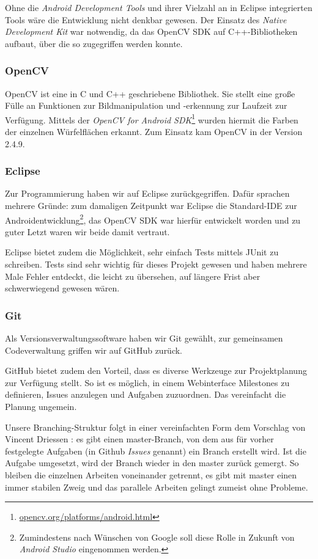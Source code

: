 Ohne die \emph{Android Development Tools} und ihrer Vielzahl an in Eclipse
integrierten Tools wäre die Entwicklung nicht denkbar gewesen. Der Einsatz des
\emph{Native Development Kit} war notwendig, da das OpenCV SDK auf
C++-Bibliotheken aufbaut, über die so zugegriffen werden konnte.

\subsubsection{OpenCV}  %

OpenCV ist eine in C und C++ geschriebene Bibliothek. Sie stellt eine große
Fülle an Funktionen zur Bildmanipulation und -erkennung zur Laufzeit zur
Verfügung. Mittels der \emph{OpenCV for Android
SDK}\footnote{\url{opencv.org/platforms/android.html}} wurden hiermit die Farben
der einzelnen Würfelflächen erkannt. Zum Einsatz kam OpenCV in der Version 2.4.9.

\subsubsection{Eclipse}  %

Zur Programmierung haben wir auf Eclipse zurückgegriffen. Dafür sprachen mehrere
Gründe: zum damaligen Zeitpunkt war Eclipse die Standard-IDE zur
Androidentwicklung\footnote{Zumindestens nach Wünschen von Google soll diese
Rolle in Zukunft von \emph{Android Studio} eingenommen werden.}, das OpenCV SDK
war hierfür entwickelt worden und zu guter Letzt waren wir beide damit vertraut.

Eclipse bietet zudem die Möglichkeit, sehr einfach Tests mittels JUnit zu
schreiben. Tests sind sehr wichtig für dieses Projekt gewesen und haben mehrere
Male Fehler entdeckt, die leicht zu übersehen, auf längere Frist aber
schwerwiegend gewesen wären.

\subsubsection{Git}  %

Als Versionsverwaltungssoftware haben wir Git gewählt, zur gemeinsamen
Codeverwaltung griffen wir auf GitHub zurück.

GitHub bietet zudem den Vorteil, dass es diverse Werkzeuge zur Projektplanung zur
Verfügung stellt. So ist es möglich, in einem Webinterface Milestones zu
definieren, Issues anzulegen und Aufgaben zuzuordnen. Das vereinfacht die
Planung ungemein.

Unsere Branching-Struktur folgt in einer vereinfachten Form dem Vorschlag von
Vincent Driessen \citep{git:driessen}: es gibt einen master-Branch, von dem aus
für vorher festgelegte Aufgaben (in Github \emph{Issues} genannt) ein Branch
erstellt wird. Ist die Aufgabe umgesetzt, wird der Branch wieder in den master
zurück gemergt. So bleiben die einzelnen Arbeiten voneinander getrennt, es gibt
mit master einen immer stabilen Zweig und das parallele Arbeiten gelingt zumeist
ohne Probleme.

